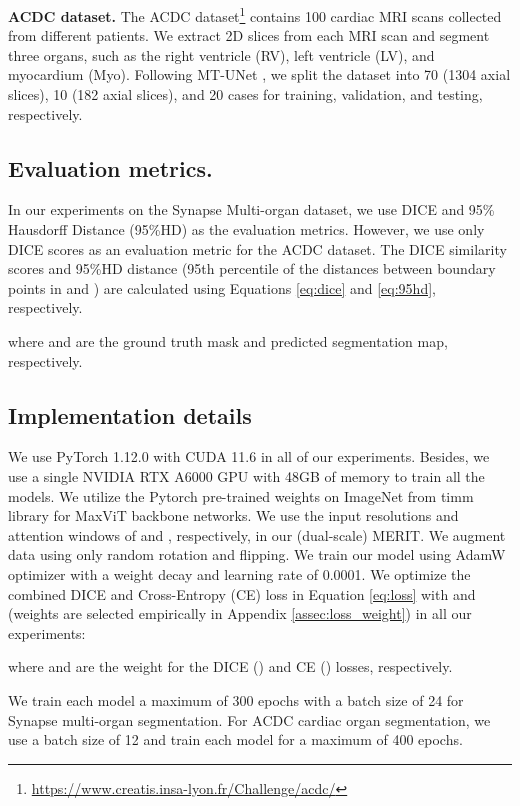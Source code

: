 \documentclass{midl}
\begin{document}
\textbf{ACDC dataset.} The ACDC dataset\footnote{\href{https://www.creatis.insa-lyon.fr/Challenge/acdc/}{https://www.creatis.insa-lyon.fr/Challenge/acdc/}} contains 100 cardiac MRI scans collected from different patients. We extract 2D slices from each MRI scan and segment three organs, such as the right ventricle (RV), left ventricle (LV), and myocardium (Myo). Following MT-UNet \cite{wang2022mixed}, we split the dataset into 70 (1304 axial slices), 10 (182 axial slices), and 20 cases for training, validation, and testing, respectively.




\subsection{Evaluation metrics.} 
\label{assec:eval_metrics}
In our experiments on the Synapse Multi-organ dataset, we use DICE and 95\% Hausdorff Distance (95\%HD) as the evaluation metrics. However, we use only DICE scores as an evaluation metric for the ACDC dataset. The DICE similarity scores  and 95\%HD distance  (95th percentile of the distances between boundary points in  and ) are calculated using Equations \ref{eq:dice} and \ref{eq:95hd}, respectively. 




where  and  are the ground truth mask and predicted segmentation map, respectively. 

\subsection{Implementation details}
\label{assec:impl_details}
We use PyTorch 1.12.0 with CUDA 11.6 in all of our experiments. Besides, we use a single NVIDIA RTX A6000 GPU with 48GB of memory to train all the models. We utilize the Pytorch pre-trained weights on ImageNet from timm library \cite{rw2019timm} for MaxViT backbone networks. We use the input resolutions and attention windows of  and , respectively, in our (dual-scale) MERIT. We augment data using only random rotation and flipping. We train our model using AdamW \cite{loshchilov2017decoupled} optimizer with a weight decay and learning rate of 0.0001. We optimize the combined DICE and Cross-Entropy (CE) loss  in Equation \ref{eq:loss} with  and  (weights are selected empirically in Appendix \ref{assec:loss_weight}) in all our experiments:

 
where  and  are the weight for the DICE () and CE () losses, respectively.

We train each model a maximum of 300 epochs with a batch size of 24 for Synapse multi-organ segmentation. For ACDC cardiac organ segmentation, we use a batch size of 12 and train each model for a maximum of 400 epochs.
\end{document}
